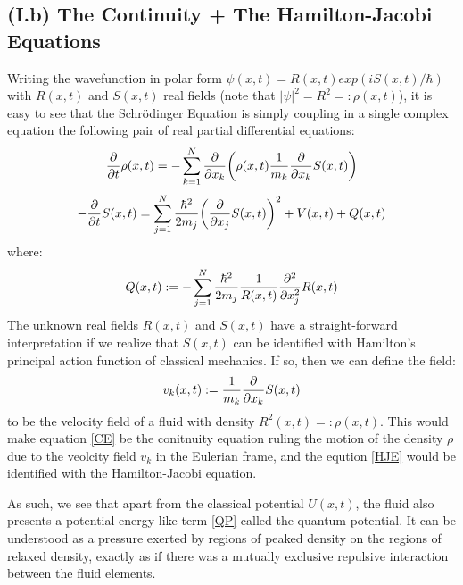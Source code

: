 \documentclass[11pt, a4paper]{article} %
\begin{document}
\subsection*{(I.b) The Continuity + The Hamilton-Jacobi Equations}
Writing the wavefunction in polar form $\psi(x,t)=R(x,t)exp(iS(x,t)/\hbar)$ with $R(x,t)$ and $S(x,t)$ real fields (note that $|\psi|^2=R^2=:\rho(x,t)$), it is easy to see that the Schrödinger Equation is simply coupling in a single complex equation the following pair of real partial differential equations:
\begin{equation}\label{CE}
\pdv{}{t} \rho(x,t)=-\sum_{k=1}^N \pdv{}{x_k}\qty( \rho(x,t)\frac{1}{m_k}\pdv{}{x_k} S(x,t) )
\end{equation}
\begin{equation}\label{HJE}
-\pdv{}{t}S(x,t) = \sum_{j=1}^N \frac{\hbar^2}{2m_j} \qty(\pdv{}{x_j} S(x,t) )^2+ V(x,t)+Q(x,t)
\end{equation}
where:
\begin{equation}\label{QP}
Q(x,t):=-\sum_{j=1}^N \frac{\hbar^2}{2m_j}\frac{1}{R(x,t)}\pdv[2]{}{x_j} R(x,t)
\end{equation}
The unknown real fields $R(x,t)$ and $S(x,t)$ have a straight-forward interpretation if we realize that $S(x,t)$ can be identified with Hamilton's principal action function of classical mechanics. If so, then we can define the field:%
\begin{equation}
v_k(x,t):=\frac{1}{m_k}\pdv{}{x_k}S(x,t)
\end{equation}
to be the velocity field of a fluid with density $R^2(x,t)=:\rho(x,t)$. This would make equation \eqref{CE} be the conitnuity equation ruling the motion of the density $\rho$ due to the veolcity field $v_k$ in the Eulerian frame, and the eqution \eqref{HJE} would be identified with the Hamilton-Jacobi equation. 

As such, we see that apart from the classical potential $U(x,t)$, the fluid also presents a potential energy-like term \eqref{QP} called the quantum potential. It can be understood as a pressure exerted by regions of peaked density on the regions of relaxed density, exactly as if there was a mutually exclusive repulsive interaction between the fluid elements. 
\end{document}
